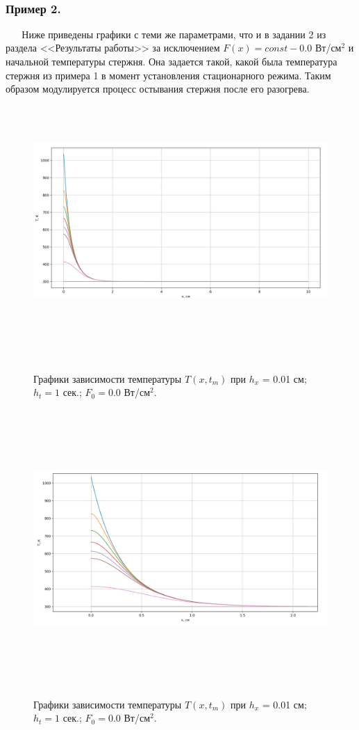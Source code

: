 \documentclass[a4paper,12pt]{article}
\begin{document}
 	
 	\newpage
 	
 	\subsubsection*{Пример 2.}
 	
 	Ниже приведены графики с теми же параметрами, что и в задании 2 из раздела <<Результаты работы>> за исключением $F(x) = const - 0.0$ Вт/см$^2$ и начальной температуры стержня. Она задается такой, какой была температура стержня из примера 1 в момент установления стационарного режима. Таким образом модулируется процесс остывания стержня после его разогрева.
 	
 	\begin{figure}[h!]
 		\begin{center}
 			{\includegraphics[scale = 0.4]{4.png}}
 			\label{ris:4}
 		\end{center}
 		\caption{Графики зависимости температуры $T(x, t_m)$ при $h_x$ = 0.01 см; $h_t = 1$ сек.; $F_0 = 0.0$ Вт/см$^2$.}
 	\end{figure}
 
 	\newpage
 
 	\begin{figure}[h!]
 		\begin{center}
 			{\includegraphics[scale = 0.4]{6.png}}
 			\label{ris:6}
 		\end{center}
 		\caption{Графики зависимости температуры $T(x, t_m)$ при $h_x$ = 0.01 см; $h_t = 1$ сек.; $F_0 = 0.0$ Вт/см$^2$.}
 	\end{figure}
\end{document}
